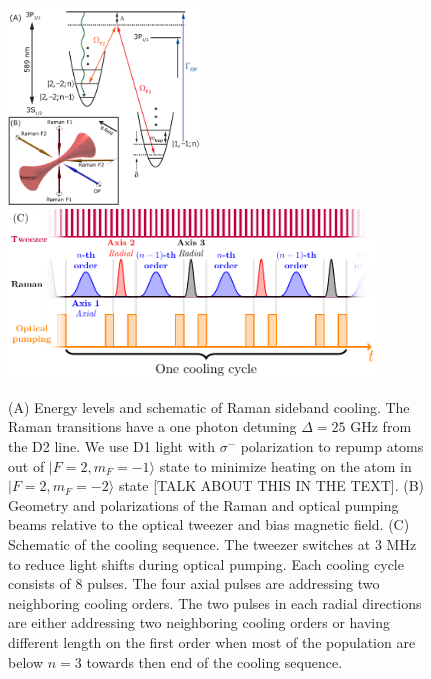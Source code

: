 \documentclass[aps,prl,twocolumn,groupedaddress]{revtex4-1}
\begin{document}
\begin{figure}
  \includegraphics[height=5.2cm]{imgs/Na_RSC_schematic.pdf}
  \includegraphics[height=4.5cm]{sequence.pdf}
  \caption{(A) Energy levels and schematic of Raman sideband cooling.
    The Raman transitions have a one photon detuning $\Delta=25$ GHz from the D2 line.
    We use D1 light with $\sigma^-$ polarization to repump atoms out of $|F=2,m_F=-1\rangle$
    state to minimize heating on the atom in $|F=2,m_F=-2\rangle$ state [TALK ABOUT THIS IN THE TEXT].
    (B) Geometry and polarizations of the Raman and optical pumping beams relative to the
    optical tweezer and bias magnetic field.
    (C) Schematic of the cooling sequence. The tweezer switches at 3 MHz to
    reduce light shifts during optical pumping. Each cooling cycle consists of $8$ pulses.
    The four axial pulses are addressing two neighboring cooling orders.
    The two pulses in each radial directions are either addressing two neighboring cooling orders
    or having different length on the first order when most of the population are below $n=3$
    towards then end of the cooling sequence.
    \label{f-setup}}
\end{figure}
\end{document}
